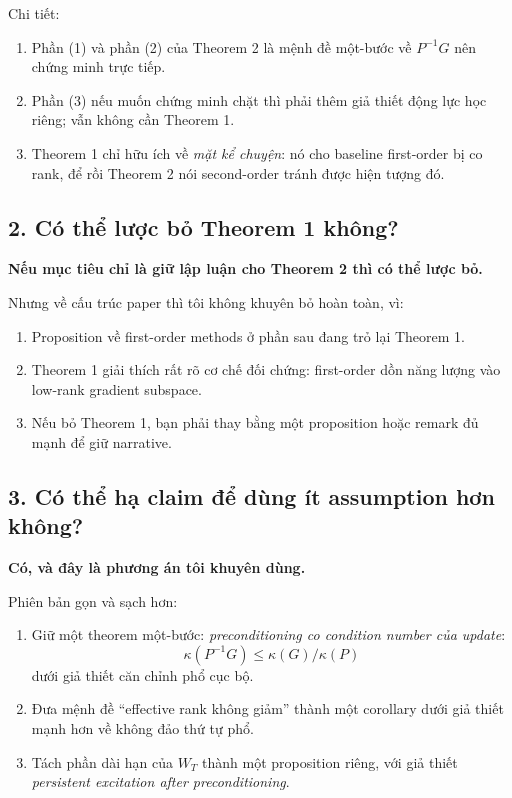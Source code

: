 \documentclass[11pt,a4paper]{article}
\begin{document}
Chi tiết:
\begin{enumerate}[nosep]
    \item Phần (1) và phần (2) của Theorem 2 là mệnh đề một-bước về $P^{-1}G$ nên chứng minh trực tiếp.
    \item Phần (3) nếu muốn chứng minh chặt thì phải thêm giả thiết động lực học riêng; vẫn không cần Theorem 1.
    \item Theorem 1 chỉ hữu ích về \emph{mặt kể chuyện}: nó cho baseline first-order bị co rank, để rồi Theorem 2 nói second-order tránh được hiện tượng đó.
\end{enumerate}

\subsection*{2. Có thể lược bỏ Theorem 1 không?}
\textbf{Nếu mục tiêu chỉ là giữ lập luận cho Theorem 2 thì có thể lược bỏ.}

Nhưng về cấu trúc paper thì tôi không khuyên bỏ hoàn toàn, vì:
\begin{enumerate}[nosep]
    \item Proposition về first-order methods ở phần sau đang trỏ lại Theorem 1.
    \item Theorem 1 giải thích rất rõ cơ chế đối chứng: first-order dồn năng lượng vào low-rank gradient subspace.
    \item Nếu bỏ Theorem 1, bạn phải thay bằng một proposition hoặc remark đủ mạnh để giữ narrative.
\end{enumerate}

\subsection*{3. Có thể hạ claim để dùng ít assumption hơn không?}
\textbf{Có, và đây là phương án tôi khuyên dùng.}

Phiên bản gọn và sạch hơn:
\begin{enumerate}[nosep]
    \item Giữ một theorem một-bước: \emph{preconditioning co condition number của update}:
    \[
    \kappa(P^{-1}G)\le \kappa(G)/\kappa(P)
    \]
    dưới giả thiết căn chỉnh phổ cục bộ.
    \item Đưa mệnh đề ``effective rank không giảm'' thành một corollary dưới giả thiết mạnh hơn về không đảo thứ tự phổ.
    \item Tách phần dài hạn của $W_T$ thành một proposition riêng, với giả thiết \emph{persistent excitation after preconditioning}.
\end{enumerate}
\end{document}
